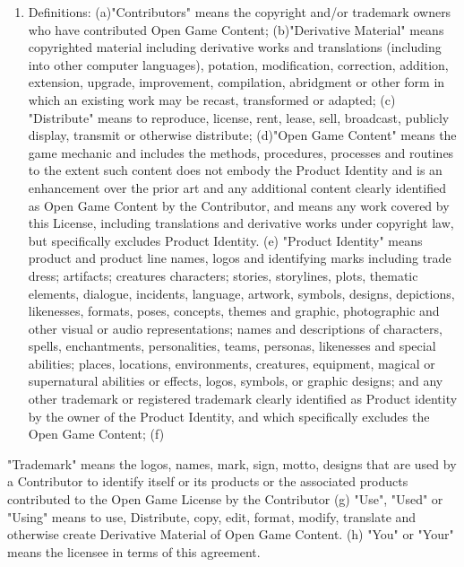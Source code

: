 \begin{multicols}{2}
\begin{enumerate}
\def\labelenumi{\arabic{enumi}.}
\item
  Definitions: (a)"Contributors" means the copyright and/or trademark
  owners who have contributed Open Game Content; (b)"Derivative
  Material" means copyrighted material including derivative works and
  translations (including into other computer languages), potation,
  modification, correction, addition, extension, upgrade, improvement,
  compilation, abridgment or other form in which an existing work may be
  recast, transformed or adapted; (c) "Distribute" means to reproduce,
  license, rent, lease, sell, broadcast, publicly display, transmit or
  otherwise distribute; (d)"Open Game Content" means the game mechanic
  and includes the methods, procedures, processes and routines to the
  extent such content does not embody the Product Identity and is an
  enhancement over the prior art and any additional content clearly
  identified as Open Game Content by the Contributor, and means any work
  covered by this License, including translations and derivative works
  under copyright law, but specifically excludes Product Identity. (e)
  "Product Identity" means product and product line names, logos and
  identifying marks including trade dress; artifacts; creatures
  characters; stories, storylines, plots, thematic elements, dialogue,
  incidents, language, artwork, symbols, designs, depictions,
  likenesses, formats, poses, concepts, themes and graphic, photographic
  and other visual or audio representations; names and descriptions of
  characters, spells, enchantments, personalities, teams, personas,
  likenesses and special abilities; places, locations, environments,
  creatures, equipment, magical or supernatural abilities or effects,
  logos, symbols, or graphic designs; and any other trademark or
  registered trademark clearly identified as Product identity by the
  owner of the Product Identity, and which specifically excludes the
  Open Game Content; (f)
\end{enumerate}


"Trademark" means the logos, names, mark, sign, motto, designs that are
used by a Contributor to identify itself or its products or the
associated products contributed to the Open Game License by the
Contributor (g) "Use", "Used" or "Using" means to use, Distribute, copy,
edit, format, modify, translate and otherwise create Derivative Material
of Open Game Content. (h) "You" or "Your" means the licensee in terms of
this agreement.



\end{multicols}
